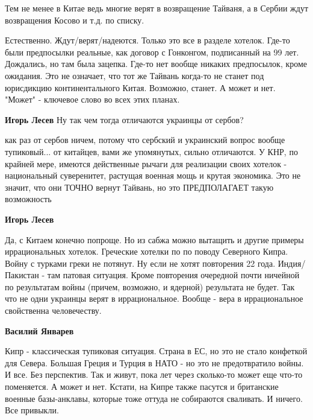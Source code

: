 \begin{itemize}
\begin{itemize}
\end{itemize} %


Тем не менее в Китае ведь многие верят в возвращение Тайваня, а в Сербии ждут
возвращения Косово и т.д. по списку.

\begin{itemize} %

Естественно. Ждут/верят/надеются. Только это все в разделе хотелок. Где-то были
предпосылки реальные, как договор с Гонконгом, подписанный на 99 лет.
Дождались, но там была зацепка. Где-то нет вообще никаких предпосылок, кроме
ожидания. Это не означает, что тот же Тайвань когда-то не станет под юрисдикцию
континентального Китая. Возможно, станет. А может и нет. "Может" - ключевое
слово во всех этих планах.

\textbf{Игорь Лесев} Ну так чем тогда отличаются украинцы от сербов?


как раз от сербов ничем, потому что сербский и украинский вопрос вообще
тупиковый... от китайцев, вами же упомянутых, сильно отличаются. У КНР, по
крайней мере, имеются действенные рычаги для реализации своих хотелок -
национальный суверенитет, растущая военная мощь и крутая экономика. Это не
значит, что они ТОЧНО вернут Тайвань, но это ПРЕДПОЛАГАЕТ такую возможность

\textbf{Игорь Лесев} 

Да, с Китаем конечно попроще. Но из сабжа можно вытащить и другие примеры
иррациональных хотелок. Греческие хотелки по по поводу Северного Кипра. Войну с
турками греки не потянут. Ну если не хотят повторения 22 года. Индия/Пакистан -
там патовая ситуация. Кроме повторения очередной почти ничейной по результатам
войны (причем, возможно, и ядерной) результата не будет. Так что не одни
украинцы верят в иррациональное. Вообще - вера в иррациональное свойственна
человечеству.

\textbf{Василий Январев} 

Кипр - классическая тупиковая ситуация. Страна в ЕС, но это не стало конфеткой
для Севера. Большая Греция и Турция в НАТО - но это не предотвратило войны. И
все. Без перспектив. Так и живут, пока лет через сколько-то может еще что-то
поменяется. А может и нет. Кстати, на Кипре также пасутся и британские военные
базы-анклавы, которые тоже оттуда не собираются сваливать. И ничего. Все
привыкли.


\end{itemize}
\end{itemize}
